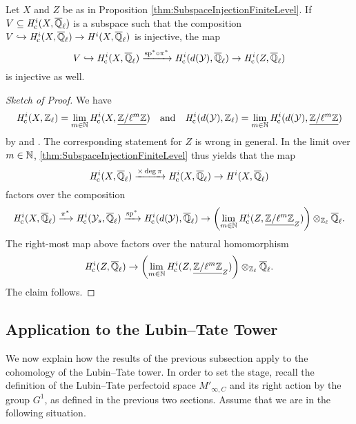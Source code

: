 \documentclass[../main.tex]{subfiles}
\begin{document}
\begin{thm}\label{thm:MiedaInjectivityAtFiniteLevel}
  Let $X$ and $Z$ be as in Proposition \ref{thm:SubspaceInjectionFiniteLevel}.
  If $V \subseteq \mathit H_{\mathrm{c}}^i(X, {\overline {\mathbb{Q}}_\ell})$ is a subspace such that the 
  composition $V \hookrightarrow \mathit H_{\mathrm{c}}^i(X, {\overline {\mathbb{Q}}_\ell}) \to \mathit H^i(X, {\overline {\mathbb{Q}}_\ell})$ is injective,
  the map 
  \begin{equation*}
    V \hookrightarrow \mathit H_{\mathrm{c}}^i(X, {\overline {\mathbb{Q}}_\ell}) \xrightarrow{\mathrm{sp}^* \circ \pi^*}
    \mathit H_{\mathrm{c}}^i(d(\mathcal{Y}), {\overline {\mathbb{Q}}_\ell}) \to \mathit H_{\mathrm{c}}^i(Z, {\overline {\mathbb{Q}}_\ell})
  \end{equation*}
  is injective as well.
  \begin{proof}[Sketch of Proof] 
  We have 
  \begin{equation*}
    \mathit H_{\mathrm{c}}^i(X, \mathbb{Z}_\ell) = \lim_{m \in \mathbb{N}} \mathit H_{\mathrm{c}}^i(X, \underline{\mathbb{Z}/\ell^m\mathbb{Z}}) 
    \quad \text{and} \quad \mathit H_{\mathrm{c}}^i(d(\mathcal{Y}), \mathbb{Z}_\ell) = \lim_{m \in \mathbb{N}}
    \mathit H_{\mathrm{c}}^i(d(\mathcal{Y}), \underline{\mathbb{Z}/\ell^m\mathbb{Z}})
  \end{equation*}
  by \cite[Corollary 9.3.3 and Proposition 10.1.15]{LeiFuEtale} and 
  \cite[Theorem 3.1]{huber1998comparison}. The corresponding statement for
  $Z$ is wrong in general. In the limit over $m \in \mathbb{N}$,
  \cref{thm:SubspaceInjectionFiniteLevel} thus yields that the map
  \begin{equation*}
    \mathit H_{\mathrm{c}}^i(X, {\overline {\mathbb{Q}}_\ell}) \xrightarrow{\times \deg \pi} \mathit H_{\mathrm{c}}^i(X, {\overline {\mathbb{Q}}_\ell}) \to \mathit H^i(X, {\overline {\mathbb{Q}}_\ell})
  \end{equation*}
  factors over the composition
  \begin{equation*}
    \mathit H_{\mathrm{c}}^i(X,      {\overline {\mathbb{Q}}_\ell}) \xrightarrow{\pi^*}
    \mathit H_{\mathrm{c}}^i(\mathcal{Y}_s,  {\overline {\mathbb{Q}}_\ell}) \xrightarrow{\mathrm{sp}^*}
    \mathit H_{\mathrm{c}}^i(d(\mathcal{Y}), {\overline {\mathbb{Q}}_\ell}) \to 
    \left(\lim_{m \in \mathbb{N}} \mathit H_{\mathrm{c}}^i(Z, \underline{\mathbb{Z}/\ell^m\mathbb{Z}}_Z) \right) \otimes_{\mathbb{Z}_\ell}
    {\overline {\mathbb{Q}}_\ell}.
  \end{equation*}
  The right-most map above factors over the natural homomorphism
  $$\mathit H_{\mathrm{c}}^i(Z, {\overline {\mathbb{Q}}_\ell}) \to \left(\lim_{m \in \mathbb{N}} \mathit H_{\mathrm{c}}^i(Z,
  \underline{\mathbb{Z}/\ell^m\mathbb{Z}}_Z) \right) \otimes_{\mathbb{Z}_\ell} {\overline {\mathbb{Q}}_\ell}.$$ 
  The claim follows.
\end{proof}
\end{thm}


\subsection{Application to the Lubin--Tate Tower} %
\label{sub:Application to the Lubin--Tate Tower}

We now explain how the results of the previous subsection apply to the 
cohomology of the Lubin--Tate tower. In order to set the stage, recall the 
definition of the Lubin--Tate perfectoid space $M'_{\infty, C}$ and its
right action by the group $G^1$, as defined in the previous two sections.
Assume that we are in the following situation.
\end{document}

